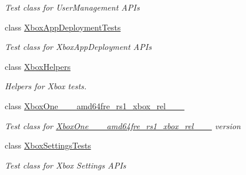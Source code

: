 \begin{DoxyCompactItemize}
\begin{DoxyCompactList}\small\item\em Test class for User\+Management A\+P\+Is \end{DoxyCompactList}\item 
class \hyperlink{class_microsoft_1_1_tools_1_1_windows_device_portal_1_1_tests_1_1_xbox_app_deployment_tests}{Xbox\+App\+Deployment\+Tests}
\begin{DoxyCompactList}\small\item\em Test class for Xbox\+App\+Deployment A\+P\+Is \end{DoxyCompactList}\item 
class \hyperlink{class_microsoft_1_1_tools_1_1_windows_device_portal_1_1_tests_1_1_xbox_helpers}{Xbox\+Helpers}
\begin{DoxyCompactList}\small\item\em Helpers for Xbox tests. \end{DoxyCompactList}\item 
class \hyperlink{class_microsoft_1_1_tools_1_1_windows_device_portal_1_1_tests_1_1_xbox_one__14385__1002__amd64frd9599e6105747a2dd5ce5cbe798a705b}{Xbox\+One\+\_\+\_\+\_\+amd64fre\+\_\+rs1\+\_\+xbox\+\_\+rel\+\_\+\_\+\_}
\begin{DoxyCompactList}\small\item\em Test class for \hyperlink{class_microsoft_1_1_tools_1_1_windows_device_portal_1_1_tests_1_1_xbox_one__14385__1002__amd64frd9599e6105747a2dd5ce5cbe798a705b}{Xbox\+One\+\_\+\_\+\_\+amd64fre\+\_\+rs1\+\_\+xbox\+\_\+rel\+\_\+\_\+\_} version \end{DoxyCompactList}\item 
class \hyperlink{class_microsoft_1_1_tools_1_1_windows_device_portal_1_1_tests_1_1_xbox_settings_tests}{Xbox\+Settings\+Tests}
\begin{DoxyCompactList}\small\item\em Test class for Xbox Settings A\+P\+Is \end{DoxyCompactList}\end{DoxyCompactItemize}
